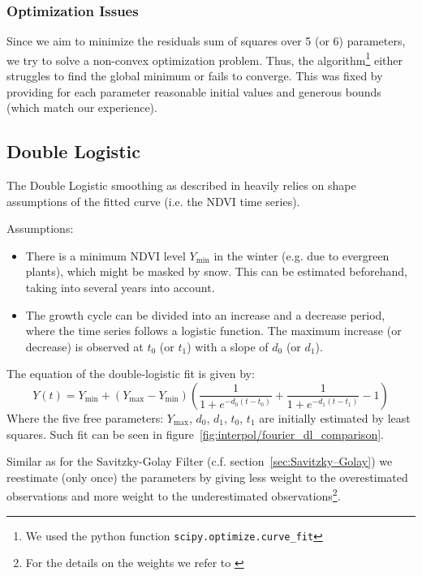\subsubsection*{Optimization Issues}
Since we aim to minimize the residuals sum of squares over 5 (or 6) parameters, we try to solve a non-convex optimization problem. Thus, the algorithm\footnote{We used the python function \texttt{scipy.optimize.curve\_fit}} either struggles to find the global minimum or fails to converge. This was fixed by providing for each parameter reasonable initial values and generous bounds (which match our experience).

\subsection{Double Logistic}
\label{sec:double_logistic}
The Double Logistic smoothing as described in \cite{beckImprovedMonitoringVegetation2006} heavily relies on shape assumptions of the fitted curve (i.e. the NDVI time series).

Assumptions:
\begin{itemize}
	\item There is a minimum NDVI level $Y_{\min}$ in the winter (e.g. due to evergreen plants), which might be masked by snow. This can be estimated beforehand, taking into several years into account.
	\item The growth cycle can be divided into an increase and a decrease period, where the time series follows a logistic function. The maximum increase (or decrease) is observed at $t_0$ (or $t_1$) with a slope of $d_0$ (or $d_1$).
\end{itemize}

The equation of the double-logistic fit is given by:
\begin{equation*}
	Y(t) = Y_{\min} + \left(Y_{\max}-Y_{\min}\right)\left(\frac{1}{1+e^{-d_0(t-t_0)}}+\frac{1}{1+e^{-d_1(t-t_1)}}-1\right)
\end{equation*}
Where the five free parameters: $Y_{\max}$, $d_0$, $d_1$, $t_0$, $t_1$ are initially estimated by least squares. Such fit can be seen in figure~\ref{fig:interpol/fourier_dl_comparison}.

Similar as for the Savitzky-Golay Filter (c.f. section~\ref{sec:Savitzky–Golay}) we reestimate (only once) the parameters by giving less weight to the overestimated observations and more weight to the underestimated observations\footnote{For the details on the weights we refer to \cite{beckImprovedMonitoringVegetation2006}}.

